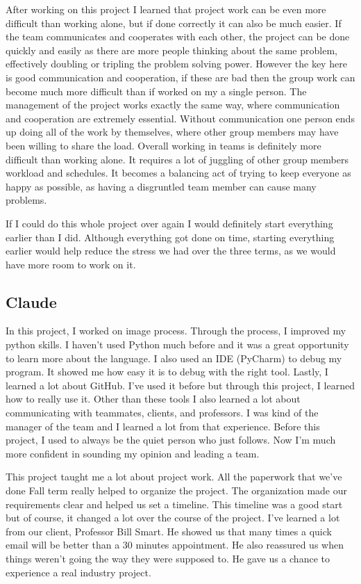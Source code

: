 \documentclass[onecolumn, draftclsnofoot,10pt, compsoc]{IEEEtran}
\begin{document}
	After working on this project I learned that project work can be even more difficult than working alone, but if done correctly it can also be much easier. If the team communicates and cooperates with each other, the project can be done quickly and easily as there are more people thinking about the same problem, effectively doubling or tripling the problem solving power. However the key here is good communication and cooperation, if these are bad then the group work can become much more difficult than if worked on my a single person. The management of the project works exactly the same way, where communication and cooperation are extremely essential. Without communication one person ends up doing all of the work by themselves, where other group members may have been willing to share the load. Overall working in teams is definitely more difficult than working alone. It requires a lot of juggling of other group members workload and schedules. It becomes a balancing act of trying to keep everyone as happy as possible, as having a disgruntled team member can cause many problems.
	
	If I could do this whole project over again I would definitely start everything earlier than I did. Although everything got done on time, starting everything earlier would help reduce the stress we had over the three terms, as we would have more room to work on it. 
	
	\subsection{Claude}
	In this project, I worked on image process. Through the process, I improved my python skills. I haven't used Python much before and it was a great opportunity to learn more about the language. I also used an IDE (PyCharm) to debug my program. It showed me how easy it is to debug with the right tool. Lastly, I learned a lot about GitHub. I've used it before but through this project, I learned how to really use it. Other than these tools I also learned a lot about communicating with teammates, clients, and professors. I was kind of the manager of the team and I learned a lot from that experience. Before this project, I used to always be the quiet person who just follows. Now I'm much more confident in sounding my opinion and leading a team.  
	
	This project taught me a lot about project work. All the paperwork that we've done Fall term really helped to organize the project. The organization made our requirements clear and helped us set a timeline. This timeline was a good start but of course, it changed a lot over the course of the project. I've learned a lot from our client, Professor Bill Smart. He showed us that many times a quick email will be better than a 30 minutes appointment. He also reassured us when things weren't going the way they were supposed to. He gave us a chance to experience a real industry project. 
	
\end{document}
